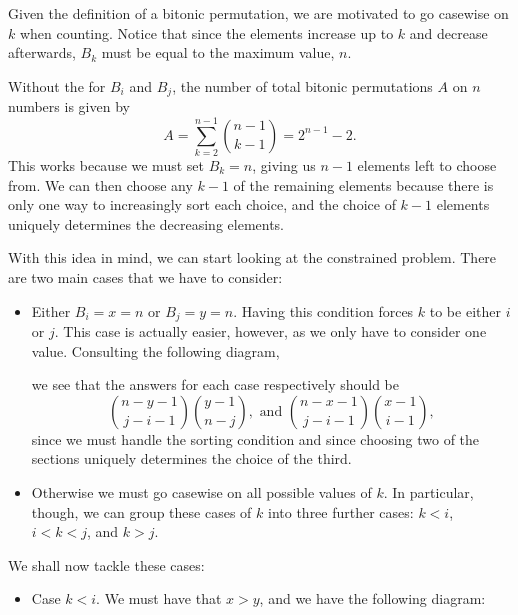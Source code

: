 \documentclass[a4paper, 12pt]{article}
\begin{document}
\begin{solution}
    Given the definition of a bitonic permutation, we are motivated to go casewise on \( k \) when counting. Notice that since the elements increase up to \( k \) and decrease afterwards, \( B_k \) must be equal to the maximum value, \( n \).

    \begin{observation}
        Without the for \( B_i \) and \( B_j \), the number of total bitonic permutations \( A \) on \( n \) numbers is given by
        \[
            A = \sum_{k = 2}^{n - 1} \binom{n - 1}{k - 1} = 2^{n - 1} - 2
        .\]
        This works because we must set \( B_k = n \), giving us \( n - 1 \) elements left to choose from. We can then choose any \( k - 1 \) of the remaining elements because there is only one way to increasingly sort each choice, and the choice of \( k - 1 \) elements uniquely determines the decreasing elements.
    \end{observation}
    With this idea in mind, we can start looking at the constrained problem. There are two main cases that we have to consider:
    \begin{itemize}
        \item Either \( B_i = x = n \) or \( B_j = y = n \). Having this condition forces \( k \) to be either \( i \) or \( j \). This case is actually easier, however, as we only have to consider one value. Consulting the following diagram,
            \begin{figure}[H]
                \centering
                
            \end{figure}

            we see that the answers for each case respectively should be
            \[
                \binom{n - y - 1}{j - i - 1} \binom{y - 1}{n - j}, \text{ and } \binom{n - x - 1}{j - i - 1} \binom{x - 1}{i - 1} 
            ,\]
            since we must handle the sorting condition and since choosing two of the sections uniquely determines the choice of the third.
        \item Otherwise we must go casewise on all possible values of \( k \). In particular, though, we can group these cases of \( k \) into three further cases: \( k < i \), \( i < k < j \), and \( k > j \).
    \end{itemize}
    We shall now tackle these cases:
    \begin{itemize}
        \item Case \( k < i \). We must have that \( x > y \), and we have the following diagram:
            \begin{figure}[H]
                \centering
                
            \end{figure}


\end{itemize}
\end{solution}
\end{document}
